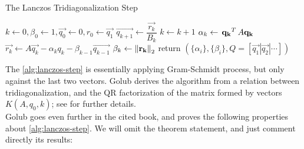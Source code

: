 \begin{algorithm}
  \label{alg:lanczos-step}
  \caption{The Lanczos Tridiagonalization Step}
%
  \DontPrintSemicolon
%
%
%
    $k \gets 0, \beta_0 \gets 1, \vec{q_0} \gets 0, r_0 \gets \vec{q_1}$ \;
    {
      $\vec{q_{k+1}} \gets \dfrac{\vec{r_k}}{B_k}$ \;
      $k \gets k + 1$ \;
      $\alpha_k \gets \,{\mathbf{q_k}}^{T}\,A\mathbf{q_k}$ \;
      $\vec{r_k} \gets A\vec{q_k} - \alpha_kq_k - \beta_{k-1}\vec{q_{k-1}}$ \;
      $\beta_k \gets \left\lVert \mathbf{r_k} \right\rVert_2$ \;
    }
%
    return $(\{\alpha_i\}, \{\beta_i\}, 
             Q = [ \vec{q_1} | \vec{q_2} | \cdots ])$ \;
\end{algorithm}
\hfill

The \cref{alg:lanczos-step} is essentially applying Gram-Schmidt process,
but only against the last two vectors. Golub derives the algorithm
from a relation between tridiagonalization, and the QR factorization of
the matrix formed by vectors $K(A,q_0,k)$; see \cite{golub13} for
further details. \\

Golub goes even further in the cited book, and proves the following
properties about \cref{alg:lanczos-step}. We will omit the theorem
statement, and just comment directly its results: \\

